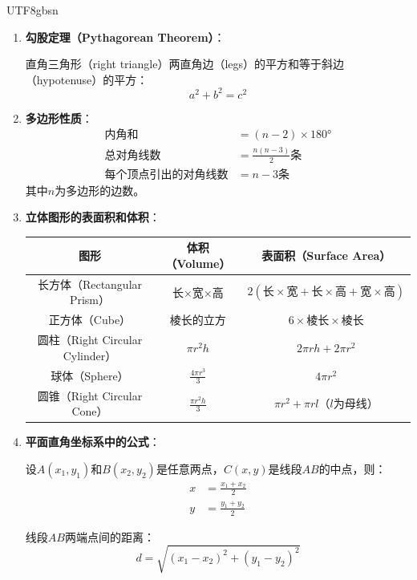 \documentclass[12pt]{article}
\begin{document}
\begin{CJK*}{UTF8}{gbsn}
\begin{enumerate}
    \item \textbf{勾股定理（Pythagorean Theorem）}：
    
    直角三角形（right triangle）两直角边（legs）的平方和等于斜边（hypotenuse）的平方：
    $$a^2 + b^2 = c^2$$
    
    \item \textbf{多边形性质}：
    \begin{align*}
        \text{内角和} &= (n-2) \times 180° \\
        \text{总对角线数} &= \frac{n(n-3)}{2} \text{条} \\
        \text{每个顶点引出的对角线数} &= n-3 \text{条}
    \end{align*}
    其中$n$为多边形的边数。
    
    \item \textbf{立体图形的表面积和体积}：
    \begin{center}
    \begin{tabular}{|c|c|c|}
    \hline
    图形 & 体积（Volume） & 表面积（Surface Area） \\
    \hline
    长方体（Rectangular Prism） & 长×宽×高 & $2(\text{长} \times \text{宽} + \text{长} \times \text{高} + \text{宽} \times \text{高})$ \\
    \hline
    正方体（Cube） & 棱长的立方 & $6 \times \text{棱长} \times \text{棱长}$ \\
    \hline
    圆柱（Right Circular Cylinder） & $\pi r^2 h$ & $2\pi r h + 2\pi r^2$ \\
    \hline
    球体（Sphere） & $\frac{4\pi r^3}{3}$ & $4\pi r^2$ \\
    \hline
    圆锥（Right Circular Cone） & $\frac{\pi r^2 h}{3}$ & $\pi r^2 + \pi r l$（$l$为母线） \\
    \hline
    \end{tabular}
    \end{center}
    
    \item \textbf{平面直角坐标系中的公式}：
    
    设$A(x_1,y_1)$和$B(x_2,y_2)$是任意两点，$C(x,y)$是线段$AB$的中点，则：
    \begin{align*}
        x &= \frac{x_1 + x_2}{2} \\
        y &= \frac{y_1 + y_2}{2}
    \end{align*}
    
    线段$AB$两端点间的距离：
    $$d = \sqrt{(x_1-x_2)^2 + (y_1-y_2)^2}$$
\end{enumerate}


\end{CJK*}
\end{document}
